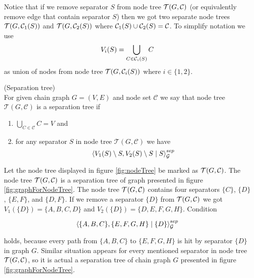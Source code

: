 Notice that if we remove separator $S$ from node tree $\mathcal{T}(G, \mathcal{C})$ (or equivalently remove edge that contain separator $S$) then we got two separate node trees $\mathcal{T}(G, \mathcal{C}_1(S))$ and $\mathcal{T}(G, \mathcal{C}_2(S))$ where 
$\mathcal{C}_1(S) \cup \mathcal{C}_2(S) = \mathcal{C}$. To simplify notation we use 
$$ V_i(S) = \bigcup_{C \in \mathcal{C}_i(S)} C$$
as union of nodes from node tree $\mathcal{T}(G, \mathcal{C}_i(S))$ where $i \in \{1, 2\}$.

\begin{defi} (Separation tree) \\
	For given chain graph $G = (V, E)$ and node set $\mathcal{C}$ we say that node tree $\mathcal{T}(G, \mathcal{C})$
	is a separation tree if 

	\begin{enumerate}
		\item $\bigcup_{C \in \mathcal{C}} C = V$ and
		\item for any separator $S$ in node tree $\mathcal{T}(G, \mathcal{C})$ we have  
		$$ \left\langle V_1(S) \setminus S , V_2(S) \setminus S \mid S \right\rangle_{\mathcal{G}}^{sep} $$
	\end{enumerate}	
	
\end{defi}
Let the node tree displayed in figure \ref{fig:nodeTree} be marked as $\mathcal{T}(G, \mathcal{C})$. The node tree $\mathcal{T}(G, \mathcal{C})$ is a separation tree of graph presented in figure \ref{fig:graphForNodeTree}. 
The node tree $\mathcal{T}(G, \mathcal{C})$ contains four separators $\{C \}$, $\{D \}$, $\{E, F \}$, and $\{D, F \}$. If we remove a separator $\{D \}$ from $\mathcal{T}(G, \mathcal{C})$ we got $V_1(\{D \}) = \{A, B, C, D \}$ 
and $V_2(\{D \}) = \{ D, E, F, G, H \}$. Condition 

\begin{equation}
	\left\langle  \{A, B, C\}  ,  \{ E, F, G, H \}  \mid  \{ D \}  \right\rangle_{\mathcal{G}}^{sep}
\end{equation}

holds, because every path from $\{A, B, C\}$ to $\{ E, F, G, H \}$ is hit by separator $\{ D\}$ in graph $G$. 
Similar situation appears for every mentioned separator in node tree $\mathcal{T}(G, \mathcal{C})$, so it is actual a separation
tree of chain graph $G$ presented in figure \ref{fig:graphForNodeTree}.



